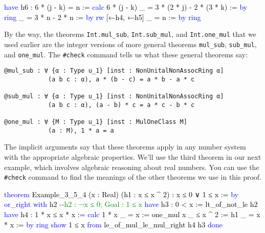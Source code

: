 \documentclass[
  letterpaper,
  DIV=11,
  numbers=noendperiod]{scrreprt}
\newenvironment{Shaded}{\begin{snugshade}}{\end{snugshade}}
\newcommand{\CommentTok}[1]{\textcolor[rgb]{0.37,0.37,0.37}{#1}}
\newcommand{\KeywordTok}[1]{\textcolor[rgb]{0.00,0.23,0.31}{#1}}
\newcommand{\NormalTok}[1]{\textcolor[rgb]{0.00,0.23,0.31}{#1}}
\renewcommand{\NormalTok}[1]{\textcolor[HTML]{000000}{#1}}
\renewcommand{\KeywordTok}[1]{\textcolor[HTML]{0000FF}{#1}}
\renewcommand{\CommentTok}[1]{\textcolor[HTML]{008000}{#1}}
\newenvironment{ind}
	{\begin{list}{}{\setlength{\leftmargin}{1em}}\item\relax}
	{\end{list}}
\theoremstyle{remark}
\begin{document}
\begin{Shaded}
\begin{Highlighting}[]
\KeywordTok{have}\NormalTok{ h6 : 6 * (j {-} k) = n :=}
  \KeywordTok{calc}\NormalTok{ 6 * (j {-} k)}
\NormalTok{    \_ = 3 * (2 * j) {-} 2 * (3 * k) := }\KeywordTok{by} \KeywordTok{ring}
\NormalTok{    \_ = 3 * n {-} 2 * n := }\KeywordTok{by} \KeywordTok{rw}\NormalTok{ [←h4, ←h5]}
\NormalTok{    \_ = n := }\KeywordTok{by} \KeywordTok{ring}
\end{Highlighting}
\end{Shaded}

By the way, the theorems \texttt{Int.mul\_sub}, \texttt{Int.sub\_mul},
and \texttt{Int.one\_mul} that we used earlier are the integer versions
of more general theorems \texttt{mul\_sub}, \texttt{sub\_mul}, and
\texttt{one\_mul}. The \texttt{\#check} command tells us what these
general theorems say:

\begin{ind}

\begin{verbatim}
@mul_sub : ∀ {α : Type u_1} [inst : NonUnitalNonAssocRing α]
            (a b c : α), a * (b - c) = a * b - a * c

@sub_mul : ∀ {α : Type u_1} [inst : NonUnitalNonAssocRing α]
            (a b c : α), (a - b) * c = a * c - b * c

@one_mul : ∀ {M : Type u_1} [inst : MulOneClass M]
            (a : M), 1 * a = a
\end{verbatim}

\end{ind}

The implicit arguments say that these theorems apply in any number
system with the appropriate algebraic properties. We'll use the third
theorem in our next example, which involves algebraic reasoning about
real numbers. You can use the \texttt{\#check} command to find the
meanings of the other theorems we use in this proof.

\begin{Shaded}
\begin{Highlighting}[]
\KeywordTok{theorem}\NormalTok{ Example\_3\_5\_4 (x : Real) (h1 : x ≤ x \^{} 2) : x ≤ 0 ∨ 1 ≤ x := }\KeywordTok{by}
  \KeywordTok{or\_right} \KeywordTok{with}\NormalTok{ h2     }\CommentTok{{-}{-}h2 : ¬x ≤ 0;  Goal : 1 ≤ x}
  \KeywordTok{have}\NormalTok{ h3 : 0 \textless{} x := lt\_of\_not\_le h2}
  \KeywordTok{have}\NormalTok{ h4 : 1 * x ≤ x * x :=}
    \KeywordTok{calc}\NormalTok{ 1 * x}
\NormalTok{      \_ = x := one\_mul x}
\NormalTok{      \_ ≤ x \^{} 2 := h1}
\NormalTok{      \_ = x * x := }\KeywordTok{by} \KeywordTok{ring}
  \KeywordTok{show}\NormalTok{ 1 ≤ x }\KeywordTok{from}\NormalTok{ le\_of\_mul\_le\_mul\_right h4 h3}
  \KeywordTok{done}
\end{Highlighting}
\end{Shaded}
\end{document}

